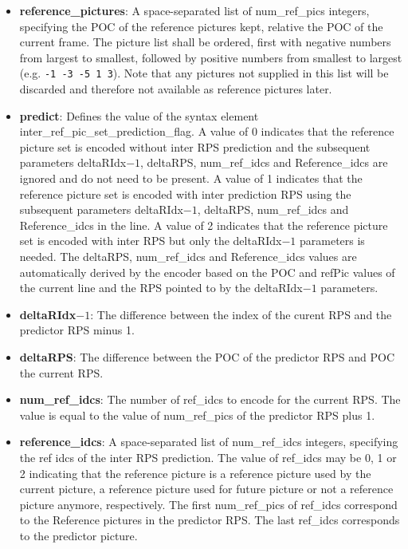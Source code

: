 \documentclass[a4paper,11pt]{jctvcdoc}
\begin{document}
\begin{itemize}
    \item[]\textbf{reference_pictures}: A space-separated list of
          num_ref_pics integers, specifying the POC of the reference pictures
          kept, relative the POC of the current frame. The picture list shall be
          ordered, first with negative numbers from largest to smallest, followed
          by positive numbers from smallest to largest (e.g. \verb|-1 -3 -5 1 3|).
          Note that any pictures not supplied in this list will be discarded and
          therefore not available as reference pictures later.

    \item[]\textbf{predict}: Defines the value of the syntax element
          inter_ref_pic_set_prediction_flag. A value of 0 indicates that the
          reference picture set is encoded without inter RPS prediction and the
          subsequent parameters deltaRIdx$-1$, deltaRPS, num_ref_idcs and
          Reference_idcs are ignored and do not need to be present. A value of 1
          indicates that the reference picture set is encoded with inter
          prediction RPS using the subsequent parameters deltaRIdx$-1$, deltaRPS,
          num_ref_idcs and Reference_idcs in the line. A value of 2 indicates that
          the reference picture set is encoded with inter RPS but only the
          deltaRIdx$-1$ parameters is needed. The deltaRPS, num_ref_idcs and
          Reference_idcs values are automatically derived by the encoder based on
          the POC and refPic values of the current line and the RPS pointed to by
          the deltaRIdx$-1$ parameters.

    \item[]\textbf{deltaRIdx$-1$}: The difference between the index of the
          curent RPS and the predictor RPS minus 1.

    \item[]\textbf{deltaRPS}: The difference between the POC of the
          predictor RPS and POC the current RPS.

    \item[]\textbf{num_ref_idcs}: The number of ref_idcs to encode for the
          current RPS.  The value is equal to the value of  num_ref_pics of the
          predictor RPS plus 1.

    \item[]\textbf{reference_idcs}: A space-separated list of num_ref_idcs
          integers, specifying the ref idcs of the inter RPS prediction. The value
          of ref_idcs may be 0, 1 or 2 indicating that the reference picture is a
          reference picture used by the current picture, a reference picture used
          for future picture or not a reference picture anymore, respectively. The
          first num_ref_pics of ref_idcs correspond to the Reference pictures in
          the predictor RPS. The last ref_idcs corresponds to the predictor
          picture.
\end{itemize}
\end{document}
